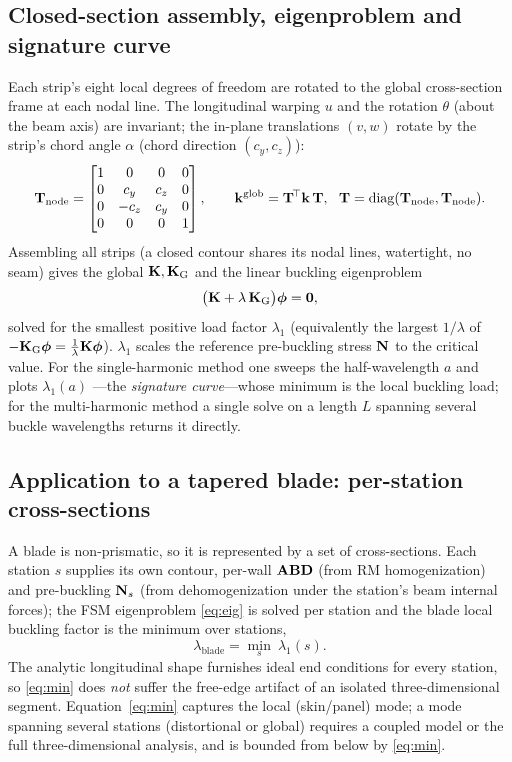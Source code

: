 \subsection{Closed-section assembly, eigenproblem and signature curve}\label{sec:assembly}
Each strip's eight local degrees of freedom are rotated to the global cross-section frame at each nodal
line. The longitudinal warping $u$ and the rotation $\theta$ (about the beam axis) are invariant; the
in-plane translations $(v,w)$ rotate by the strip's chord angle $\alpha$ (chord direction
$(c_y,c_z)$):
\begin{equation}
\mathbf T_{\text{node}}=\begin{bmatrix}1&0&0&0\\0&c_y&c_z&0\\0&-c_z&c_y&0\\0&0&0&1\end{bmatrix},\qquad
\mathbf{k}^{\text{glob}}=\mathbf T^{\!\top}\mathbf{k}\,\mathbf T,\ \ \mathbf T=\mathrm{diag}(\mathbf T_{\text{node}},\mathbf T_{\text{node}}).
\label{eq:transform}
\end{equation}
Assembling all strips (a closed contour shares its nodal lines, watertight, no seam) gives the global
$\mathbf{K},\mathbf{K}_{\mathrm{G}}$ and the linear buckling eigenproblem
\begin{equation}
\big(\mathbf{K}+\lambda\,\mathbf{K}_{\mathrm{G}}\big)\boldsymbol{\phi}=\bm0 ,
\label{eq:eig}
\end{equation}
solved for the smallest positive load factor $\lambda_1$ (equivalently the largest $1/\lambda$ of
$-\mathbf{K}_{\mathrm{G}}\boldsymbol{\phi}=\tfrac1\lambda\mathbf{K}\boldsymbol{\phi}$). $\lambda_1$ scales the reference pre-buckling stress $\mathbf{N}$ to the
critical value. For the single-harmonic method one sweeps the half-wavelength $a$ and plots $\lambda_1(a)$
---the \emph{signature curve}---whose minimum is the local buckling load; for the multi-harmonic method a
single solve on a length $L$ spanning several buckle wavelengths returns it directly.

\subsection{Application to a tapered blade: per-station cross-sections}\label{sec:perstation}
A blade is non-prismatic, so it is represented by a set of cross-sections. Each station $s$ supplies its
own contour, per-wall $\mathbf{ABD}$ (from RM homogenization) and pre-buckling $\mathbf{N}_s$ (from dehomogenization under
the station's beam internal forces); the FSM eigenproblem \eqref{eq:eig} is solved per station and the
blade local buckling factor is the minimum over stations,
\begin{equation}
\lambda_{\text{blade}}=\min_s\ \lambda_1(s).
\label{eq:min}
\end{equation}
The analytic longitudinal shape furnishes ideal end conditions for every station, so \eqref{eq:min} does
\emph{not} suffer the free-edge artifact of an isolated three-dimensional segment. Equation~\eqref{eq:min}
captures the local (skin/panel) mode; a mode spanning several stations (distortional or global) requires a
coupled model or the full three-dimensional analysis, and is bounded from below by \eqref{eq:min}.
